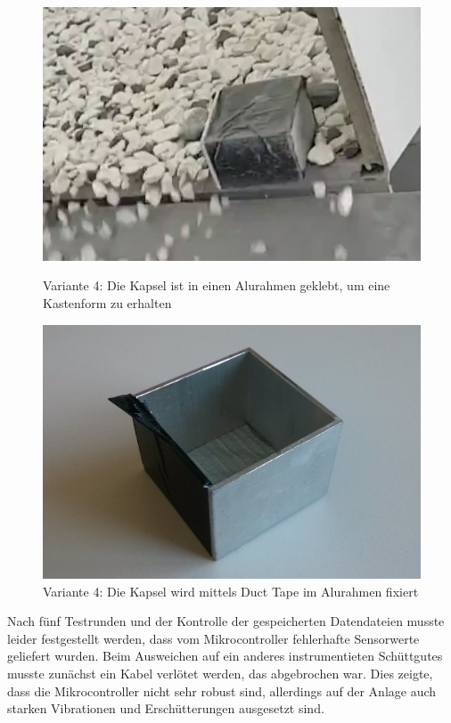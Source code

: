 \begin{figure}[htb]
	\centering
	\begin{minipage}[t]{0.49\linewidth}
		\centering
		\includegraphics[width=\linewidth]{images/k4-alu.JPG}
		\caption{Variante 4: Die Kapsel ist in einen Alurahmen geklebt, um eine Kastenform zu erhalten}
		\label{fig:k4_alu}
	\end{minipage}%
	\hfill
	\begin{minipage}[t]{0.49\linewidth}
		\centering
		\includegraphics[width=\linewidth]{images/k4-alurahmen.jpg}
		\caption{Variante 4: Die Kapsel wird mittels Duct Tape im Alurahmen fixiert}
		\label{fig:k4_alurahmen}
	\end{minipage}
\end{figure}

Nach fünf Testrunden und der Kontrolle der gespeicherten Datendateien musste leider festgestellt werden, dass vom Mikrocontroller fehlerhafte Sensorwerte geliefert wurden. Beim Ausweichen auf ein anderes instrumentieten Schüttgutes musste zunächst ein Kabel verlötet werden, das abgebrochen war. Dies zeigte, dass die Mikrocontroller nicht sehr robust sind, allerdings auf der Anlage auch starken Vibrationen und Erschütterungen ausgesetzt sind.

